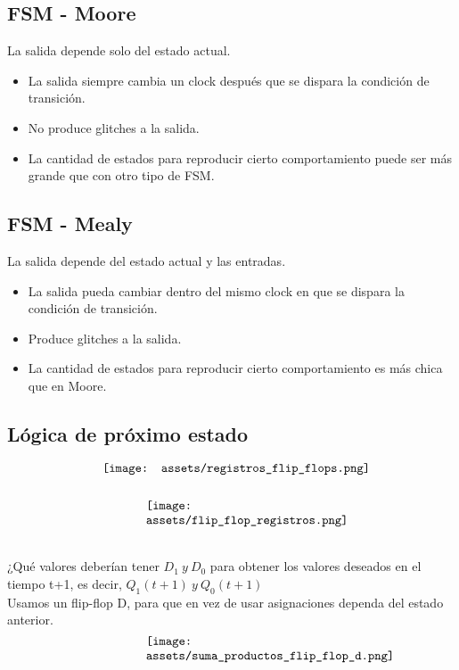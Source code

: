 \documentclass[10pt,a4paper]{article}
\begin{document}
\subsection*{FSM - Moore}
La salida depende solo del estado actual.
\begin{itemize}
    \item La salida siempre cambia un clock después que se dispara la condición de transición.
    \item No produce glitches a la salida.
    \item La cantidad de estados para reproducir cierto comportamiento puede ser más grande que con otro tipo de FSM.
\end{itemize}

\subsection*{FSM - Mealy}
La salida depende del estado actual y las entradas.
\begin{itemize}
    \item La salida pueda cambiar dentro del mismo clock en que se dispara la condición de transición.
    \item Produce glitches a la salida.
    \item La cantidad de estados para reproducir cierto comportamiento es más chica que en Moore.
\end{itemize}

\subsection*{Lógica de próximo estado}
\[\begin{minipage}[b]{0.6\textwidth}
    \texttt{[image: assets/registros\_flip\_flops.png]}
    \label{fig:registros_flip_flops}
\end{minipage}\]
\[\begin{minipage}[b]{0.4\textwidth}
    \texttt{[image: assets/flip\_flop\_registros.png]}
    \label{fig:flip_flop_registros}
\end{minipage}\]

¿Qué valores deberían tener \(D_{1} \ y \ D_{0}\) para obtener los valores deseados en el tiempo t+1, es decir, \(Q_{1}(t+1) \ y \ Q_{0}(t+1)\) \\
Usamos un flip-flop D, para que en vez de usar asignaciones dependa del estado anterior.
\[\begin{minipage}[b]{0.4\textwidth}
    \texttt{[image: assets/suma\_productos\_flip\_flop\_d.png]}
    \label{fig:suma_productos_flip_flop_d}
\end{minipage}\]
\end{document}
